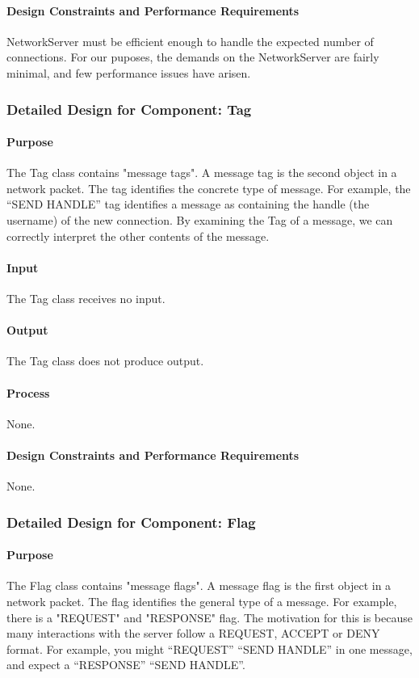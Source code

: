 \documentclass[12pt,a4paper,titlepage]{article}
\begin{document}
\paragraph{Design Constraints and Performance Requirements} NetworkServer must be efficient enough to handle the expected number of connections. For our puposes, the demands on the NetworkServer are fairly minimal, and few performance issues have arisen.

\subsubsection{Detailed Design for Component: Tag }
\paragraph{Purpose} The Tag class contains "message tags". A message tag is the second object in a network packet. The tag identifies the concrete type of message. For example, the ``SEND HANDLE'' tag identifies a message as containing the handle (the username) of the new connection. By examining the Tag of a message, we can correctly interpret the other contents of the message. 
\paragraph{Input} The Tag class receives no input. 
\paragraph{Output} The Tag class does not produce output. 
\paragraph{Process} None. 
\paragraph{Design Constraints and Performance Requirements} None.

\subsubsection{Detailed Design for Component: Flag }
\paragraph{Purpose} The Flag class contains "message flags". A message flag is the first object in a network packet. The flag identifies the general type of a message. For example, there is a "REQUEST" and "RESPONSE" flag. The motivation for this is because many interactions with the server follow a REQUEST, ACCEPT or DENY format. For example, you might ``REQUEST'' ``SEND HANDLE'' in one message, and expect a ``RESPONSE'' ``SEND HANDLE''.
\end{document}
